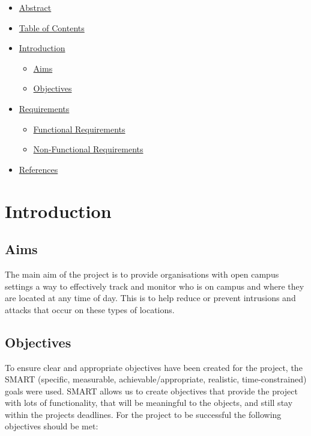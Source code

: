 \documentclass[
  english,
  a4paper,
,tablecaptionabove
]{scrartcl}
\providecommand{\tightlist}{%
  \setlength{\itemsep}{0pt}\setlength{\parskip}{0pt}}
\begin{document}
\begin{itemize}
\tightlist
\item
  \protect\hyperlink{abstract}{Abstract}
\item
  \protect\hyperlink{table-of-contents}{Table of Contents}
\item
  \protect\hyperlink{introduction}{Introduction}

  \begin{itemize}
  \tightlist
  \item
    \protect\hyperlink{aims}{Aims}
  \item
    \protect\hyperlink{objectives}{Objectives}
  \end{itemize}
\item
  \protect\hyperlink{requirements}{Requirements}

  \begin{itemize}
  \tightlist
  \item
    \protect\hyperlink{functional-requirements}{Functional Requirements}
  \item
    \protect\hyperlink{non-functional-requirements}{Non-Functional
    Requirements}
  \end{itemize}
\item
  \protect\hyperlink{references}{References}
\end{itemize}

\newpage

\hypertarget{introduction}{%
\section{Introduction}\label{introduction}}

\hypertarget{aims}{%
\subsection{Aims}\label{aims}}

The main aim of the project is to provide organisations with open campus
settings a way to effectively track and monitor who is on campus and
where they are located at any time of day. This is to help reduce or
prevent intrusions and attacks that occur on these types of locations.

\hypertarget{objectives}{%
\subsection{Objectives}\label{objectives}}

To ensure clear and appropriate objectives have been created for the
project, the SMART (specific, measurable, achievable/appropriate,
realistic, time-constrained) goals were used. SMART allows us to create
objectives that provide the project with lots of functionality, that
will be meaningful to the objects, and still stay within the projects
deadlines. For the project to be successful the following objectives
should be met:
\end{document}
